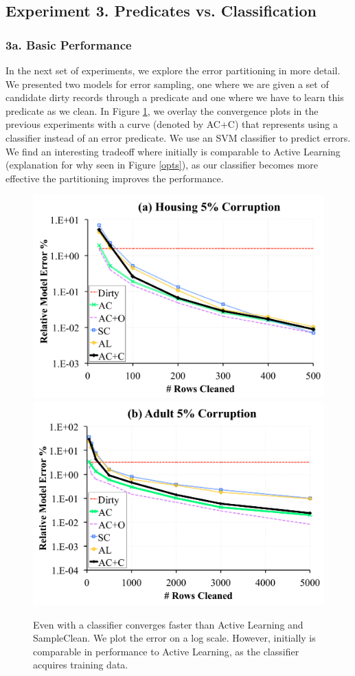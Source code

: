 \subsection{Experiment 3. Predicates vs. Classification}

\subsubsection{3a. Basic Performance}
In the next set of experiments, we explore the error partitioning in more detail.
We presented two models for error sampling, one where we are given a set of candidate dirty records through a predicate and one where we have to learn this predicate as we clean.
In Figure \ref{pred-perf}, we overlay the convergence plots in the previous experiments with a curve (denoted by AC+C) that represents \sys using a classifier instead of an error predicate.
We use an SVM classifier to predict errors.
We find an interesting tradeoff where initially \sys is comparable to Active Learning (explanation for why seen in Figure \ref{opts}), as our classifier becomes more effective the partitioning improves the performance.

\begin{figure}[t]
\centering
 \includegraphics[width=0.48\columnwidth]{exp/exp11a.pdf}
 \includegraphics[width=0.48\columnwidth]{exp/exp11b.pdf}
 \caption{Even with a classifier \sys converges faster than Active Learning and SampleClean.
 We plot the error on a log scale. 
 However, initially \sys is comparable in performance to Active Learning, as the classifier acquires training data. \label{pred-perf}}
\end{figure}


